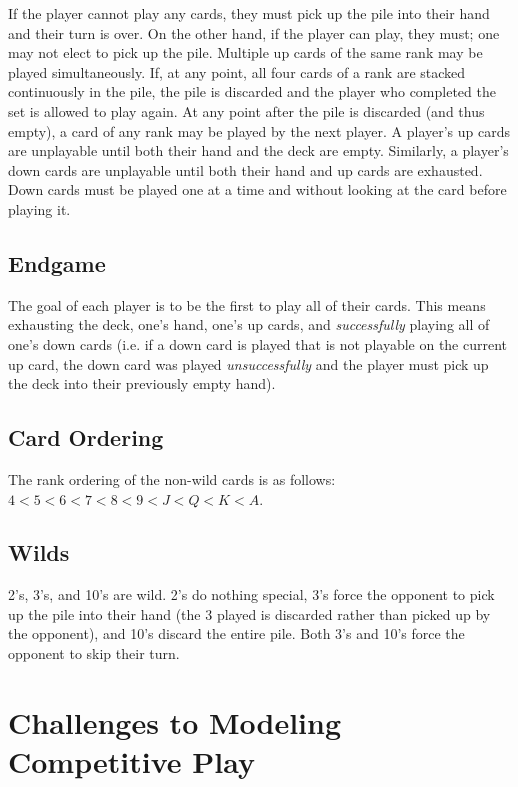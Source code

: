 \documentclass[paper=a4, fontsize=11pt]{scrartcl}
\numberwithin{equation}{section}		%
\numberwithin{figure}{section}			%
\numberwithin{table}{section}				%
\begin{document}
If the player cannot play any cards, they must pick up the pile into their hand and their turn is over. On the other hand, if the player can play, they must; one may not elect to pick up the pile. Multiple up cards of the same rank may be played simultaneously. If, at any point, all four cards of a rank are stacked continuously in the pile, the pile is discarded and the player who completed the set is allowed to play again. At any point after the pile is discarded (and thus empty), a card of any rank may be played by the next player. A player's up cards are unplayable until both their hand and the deck are empty. Similarly, a player's down cards are unplayable until both their hand and up cards are exhausted. Down cards must be played one at a time and without looking at the card before playing it. 
	
\subsection{Endgame}
The goal of each player is to be the first to play all of their cards. This means exhausting the deck, one's hand, one's up cards, and \emph{successfully} playing all of one's down cards (i.e. if a down card is played that is not playable on the current up card, the down card was played \emph{unsuccessfully} and the player must pick up the deck into their previously empty hand). 
	
\subsection{Card Ordering}
The rank ordering of the non-wild cards is as follows: $4 < 5 < 6 < 7< 8 < 9 < J < Q < K < A$. 
	
\subsection{Wilds}
2's, 3's, and 10's are wild. 2's do nothing special, 3's force the opponent to pick up the pile into their hand (the 3 played is discarded rather than picked up by the opponent), and 10's discard the entire pile. Both 3's and 10's force the opponent to skip their turn. 


\section{Challenges to Modeling Competitive Play}
\end{document}
